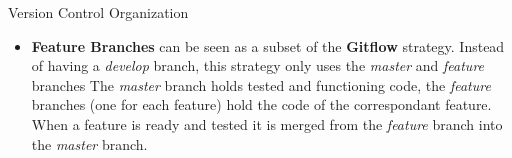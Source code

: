 \begin{pattern}{Version Control Organization}
{\begin{itemize}
					\item \textbf{Feature Branches} can be seen as a subset of the \textbf{Gitflow} strategy. Instead of having a \textit{develop} branch, this strategy only uses the \textit{master} and \textit{feature} branches The \textit{master} branch holds tested and functioning code, the \textit{feature} branches (one for each feature) hold the code of the correspondant feature. When a feature is ready and tested it is merged from the \textit{feature} branch into the \textit{master} branch.
				\end{itemize}
			}
		\end{pattern}
